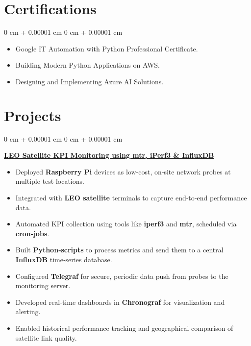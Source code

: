 \documentclass[10pt, letterpaper]{article}
\newenvironment{highlights}{
    \begin{itemize}[
        topsep=0.10 cm,
        parsep=0.10 cm,
        partopsep=0pt,
        itemsep=0pt,
        leftmargin=0 cm + 10pt
    ]
}{
    \end{itemize}
} %
\newenvironment{onecolentry}{
    \begin{adjustwidth}{
        0 cm + 0.00001 cm
    }{
        0 cm + 0.00001 cm
    }
}{
    \end{adjustwidth}
} %
\begin{document}
    \section{Certifications}
\begin{onecolentry}
    \begin{highlights}
        \item Google IT Automation with Python Professional Certificate.
        \item Building Modern Python Applications on AWS.
        \item Designing and Implementing Azure AI Solutions.
    \end{highlights}
\end{onecolentry}

 \section{Projects}
\begin{onecolentry}
    \textbf{\href{https://github.com/sayakr428/leo-kpi-monitoring}{LEO Satellite KPI Monitoring using mtr, iPerf3 \& InfluxDB}}
    \begin{highlights}
        \item Deployed \textbf{Raspberry Pi} devices as low‑cost, on‑site network probes at multiple test locations.
        \item Integrated with \textbf{LEO satellite} terminals to capture end‑to‑end performance data.
        \item Automated KPI collection using tools like \textbf{iperf3} and \textbf{mtr}, scheduled via \textbf{cron‑jobs}.
        \item Built \textbf{Python‑scripts} to process metrics and send them to a central \textbf{InfluxDB} time‑series database.
        \item Configured \textbf{Telegraf} for secure, periodic data push from probes to the monitoring server.
        \item Developed real‑time dashboards in \textbf{Chronograf} for visualization and alerting.
        \item Enabled historical performance tracking and geographical comparison of satellite link quality.
    \end{highlights}
\end{onecolentry}
\vspace{0.20 cm}
\end{document}

